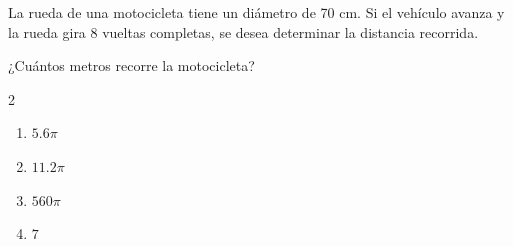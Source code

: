 La rueda de una motocicleta tiene un diámetro de 70 cm. Si el vehículo avanza y la rueda gira 8 vueltas completas, se desea determinar la distancia recorrida.

¿Cuántos metros recorre la motocicleta?

\begin{multicols}{2}
\begin{enumerate}[label=\alph*), leftmargin=*]
\item $5.6\pi$
\item $11.2\pi$
\item $560\pi$
\item $7$
\end{enumerate}
\end{multicols}